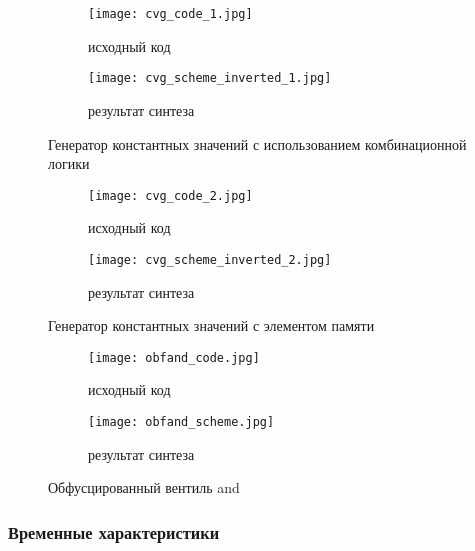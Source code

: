 \begin{figure}[ht]
\centering
  \begin{subfigure}[b]{1\textwidth}
    \centering
    \texttt{[image: cvg\_code\_1.jpg]}
    \caption*{исходный код}
  \end{subfigure}
  \begin{subfigure}[b]{1\textwidth}
    \centering
    \texttt{[image: cvg\_scheme\_inverted\_1.jpg]}
    \caption*{результат синтеза}
  \end{subfigure}
  \caption{ Генератор константных значений с использованием комбинационной логики}
  \label{fig:fire_alarms}
\end{figure}



\begin{figure}[ht]
\centering
  \begin{subfigure}[b]{1\textwidth}
    \centering
    \texttt{[image: cvg\_code\_2.jpg]}
    \caption*{исходный код}
  \end{subfigure}
  \begin{subfigure}[b]{1\textwidth}
    \centering
    \texttt{[image: cvg\_scheme\_inverted\_2.jpg]}
    \caption*{результат синтеза}
  \end{subfigure}
  \caption{ Генератор константных значений с элементом памяти }
  \label{fig:fire_alarms}
\end{figure}





\begin{figure}[ht]
\centering
  \begin{subfigure}[p]{1\textwidth}
    \centering
    \texttt{[image: obfand\_code.jpg]}
    \caption*{исходный код}
  \end{subfigure}
  \begin{subfigure}[b]{1\textwidth}
    \centering
    \texttt{[image: obfand\_scheme.jpg]}
    \caption*{результат синтеза}
  \end{subfigure}
  \caption{ Обфусцированный вентиль and }
  \label{fig:fire_alarms}
\end{figure}

\FloatBarrier


\subsubsection{Временные характеристики}

